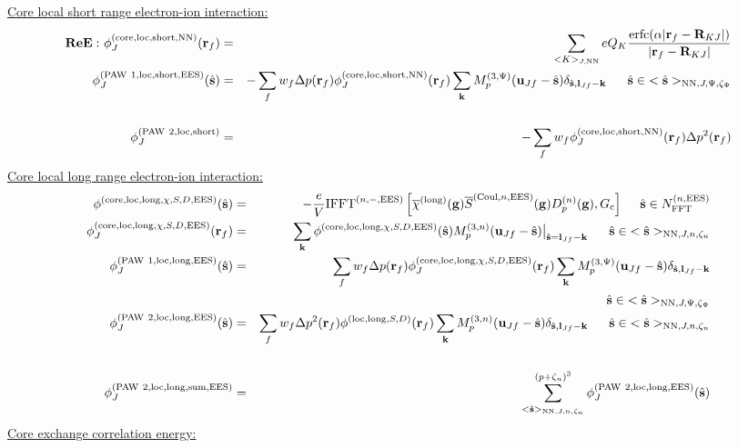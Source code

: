 \documentclass[paper=a4, fontsize=11pt]{article} %
\numberwithin{equation}{section} %
\numberwithin{figure}{section} %
\numberwithin{table}{section} %
\newcommand{\ol}{\overline}
\newcommand{\bu}{{\bf{u}}}
\newcommand{\bl}{{\bf{l}}}
\newcommand{\bk}{{\bf{k}}}
\newcommand{\bs}{{\bf{s}}}
\newcommand{\bg}{{\bf{g}}}
\newcommand{\br}{{\bf{r}}}
\newcommand{\bR}{{\bf{R}}}
\newcommand{\hs}{{\hat{\bf{s}}}}
\newcommand{\rEES}{{\mathrm{EES}}}
\newcommand{\rcore}{{\mathrm{core}}}
\newcommand{\rNN}{{\mathrm{NN}}}
\newcommand{\rCo}{{\mathrm{Coul}}}
\newcommand{\rshort}{{\mathrm{short}}}
\newcommand{\rlong}{{\mathrm{long}}}
\newcommand{\rerfc}{{\mathrm{erfc}}}
\newcommand{\rP}{{\mathrm{PAW}}}
\newcommand{\rsum}{{\mathrm{sum}}}
\newcommand{\rlo}{{\mathrm{loc}}}
\newcommand{\NFFTnEES}{{N^{(n,\rEES)}_{\mathrm{FFT}}}}
\newcommand{\Gc}{{G_{\mathrm{c}}}}
\newcommand{\Mn}{{M_p^{(3,n)}}}
\newcommand{\Mp}{{M_p^{(3,\Psi)}}}
\newcommand{\IFFTniEES}{{\mathrm{IFFT}^{(n,-,\rEES)}}}
\newcommand{\pzn}{{(p+\zeta_n)^3}}
\newcommand{\hsJp}{{<\hs>_{\rNN,J,\Psi,\zeta_\Psi}}}
\newcommand{\hsJn}{{<\hs>_{\rNN,J,n,\zeta_n}}}
\newcommand{\hsinJp}{{\ \ \ \ \ \hs  \in  \hsJp}}
\newcommand{\hsinJn}{{\ \ \ \ \ \hs  \in  \hsJn}}
\newcommand{\hsinnEES}{{\ \ \ \ \hs \in \NFFTnEES}}
\newcommand{\ReE}{{{\bf ReE:\ }}}
\begin{document}
\underline{Core local short range electron-ion interaction:}
\begin{eqnarray}\label{eq:termsdpphi}
\ReE \phi_J^{(\rcore,\rlo,\rshort,\rNN)}(\br_f) &=& \sum_{<K>_{J,\rNN}}eQ_K\frac{\rerfc(\alpha|\br_f-\bR_{KJ}|)}{|\br_f-\bR_{KJ}|}\\
\label{phi:phiSloc}
\phi_J^{(\rP\ 1,\rlo,\rshort,\rEES)}(\hs) &=& -\sum_f w_f \Delta p(\br_f) \phi_J^{(\rcore,\rlo,\rshort,\rNN)}(\br_f)  \sum_{\bk} \Mp(\bu_{Jf}-\hat \bs)\delta_{\hat \bs,\bl_{Jf}-\bk} \hsinJp \nonumber\\
&\ &\\
\label{phi:PAW2locshort}
\phi_J^{(\rP\ 2,\rlo,\rshort)} 
&=& - \sum_f w_f \phi_J^{(\rcore,\rlo,\rshort,\rNN)}(\br_f)\Delta p^2(\br_f)
\end{eqnarray}
\underline{Core local long range electron-ion interaction:}
\begin{eqnarray}
\label{phi:slongSD}
\phi^{(\rcore,\rlo,\rlong,\chi,S,D,\rEES)}(\hs)
&=& -\frac{e}{V}\IFFTniEES \left[ \ol \chi^{(\rlong)}(\bg)  \ol S^{(\rCo,n,\rEES)}(\bg) D_p^{(n)}(\bg),\Gc \right] \hsinnEES\\
\label{phi:flongSD}
\phi_J^{(\rcore,\rlo,\rlong,\chi,S,D,\rEES)}(\br_f) &=& \sum_{\bk} \phi^{(\rcore,\rlo,\rlong,\chi,S,D,\rEES)}(\hs) \Mn(\bu_{Jf}-\hat \bs) \big|_{\hat \bs=\bl_{Jf}-\bk} \hsinJn\\
\phi_J^{(\rP\ 1,\rlo,\rlong,\rEES)}(\hs) &=& \sum_f w_f \Delta p(\br_f) \phi_J^{(\rcore,\rlo,\rlong,\chi,S,D,\rEES)}(\br_f)  \sum_{\bk} \Mp(\bu_{Jf}-\hat \bs) \delta_{\hat \bs,\bl_{Jf}-\bk} \nonumber\\
&&\hspace*{3.1 in} \hsinJp  \\
\phi_J^{(\rP\ 2,\rlo,\rlong,\rEES)}(\hs) &=& \sum_f w_f \Delta p^2(\br_f) \phi^{(\rlo,\rlong,S,D)}(\br_f) \sum_{\bk}  M_p^{(3,n)}(\bu_{Jf}-\hat \bs)\delta_{\hat \bs,\bl_{Jf}-\bk} \hsinJn\nonumber\\
&\ &\\
\phi_J^{(\rP\ 2,\rlo,\rlong,\rsum,\rEES)} &=& \sum_{\hsJn}^{\pzn} \phi_J^{(\rP\ 2,\rlo,\rlong,\rEES)}(\hs) 
\end{eqnarray}
\underline{Core exchange correlation energy:}
\end{document}

